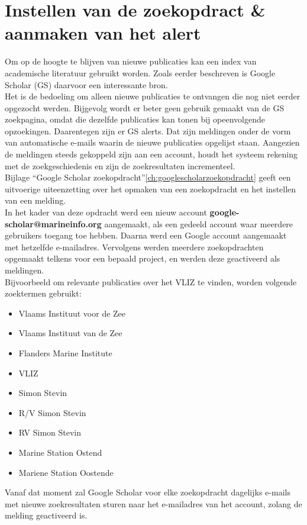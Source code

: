 \section{Instellen van de zoekopdract \& aanmaken van het alert}
Om op de hoogte te blijven van nieuwe publicaties kan een index van academische literatuur gebruikt worden. Zoals eerder beschreven is Google Scholar (GS) daarvoor een interessante bron.\\
Het is de bedoeling om alleen nieuwe publicaties te ontvangen die nog niet eerder opgezocht werden. Bijgevolg wordt er beter geen gebruik gemaakt van de GS zoekpagina, omdat die dezelfde publicaties kan tonen bij opeenvolgende opzoekingen. Daarentegen zijn er GS alerts. Dat zijn meldingen onder de vorm van automatische e-mails waarin de nieuwe publicaties opgelijst staan. Aangezien de meldingen steeds gekoppeld zijn aan een account, houdt het systeem rekening met de zoekgeschiedenis en zijn de zoekresultaten incrementeel.\\
Bijlage ``Google Scholar zoekopdracht''\ref{ch:googlescholarzoekopdracht} geeft een uitvoerige uiteenzetting over het opmaken van een zoekopdracht en het instellen van een melding.\\
In het kader van deze opdracht werd een nieuw account \textbf{google-scholar@marineinfo.org} aangemaakt, als een gedeeld account waar meerdere gebruikers toegang toe hebben. Daarna werd een Google account aangemaakt met hetzelfde e-mailadres. Vervolgens werden meerdere zoekopdrachten opgemaakt telkens voor een bepaald project, en werden deze geactiveerd als meldingen.\\
Bijvoorbeeld om relevante publicaties over het VLIZ te vinden, worden volgende zoektermen gebruikt:
\begin{itemize}
    \item Vlaams Instituut voor de Zee
    \item Vlaams Instituut van de Zee
    \item Flanders Marine Institute
    \item VLIZ
    \item Simon Stevin
    \item R/V Simon Stevin
    \item RV Simon Stevin
    \item Marine Station Ostend
    \item Mariene Station Oostende
\end{itemize}

Vanaf dat moment zal Google Scholar voor elke zoekopdracht dagelijks e-mails met nieuwe zoekresultaten sturen naar het e-mailadres van het account, zolang de melding geactiveerd is.